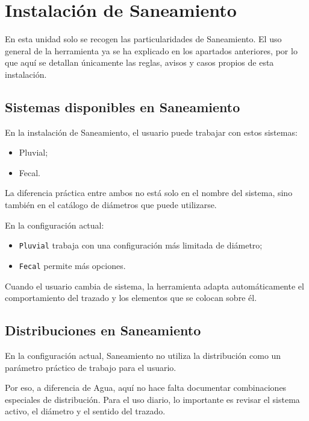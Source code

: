 ﻿\section{Instalación de Saneamiento}

En esta unidad solo se recogen las particularidades de Saneamiento. El uso general de la herramienta ya se ha explicado en los apartados anteriores, por lo que aquí se detallan únicamente las reglas, avisos y casos propios de esta instalación.

\subsection{Sistemas disponibles en Saneamiento}

En la instalación de Saneamiento, el usuario puede trabajar con estos sistemas:

\begin{itemize}
\item Pluvial;
\item Fecal.
\end{itemize}

La diferencia práctica entre ambos no está solo en el nombre del sistema, sino también en el catálogo de diámetros que puede utilizarse.

En la configuración actual:

\begin{itemize}
\item \texttt{Pluvial} trabaja con una configuración más limitada de diámetro;
\item \texttt{Fecal} permite más opciones.
\end{itemize}

Cuando el usuario cambia de sistema, la herramienta adapta automáticamente el comportamiento del trazado y los elementos que se colocan sobre él.


\subsection{Distribuciones en Saneamiento}

En la configuración actual, Saneamiento no utiliza la distribución como un parámetro práctico de trabajo para el usuario.

Por eso, a diferencia de Agua, aquí no hace falta documentar combinaciones especiales de distribución. Para el uso diario, lo importante es revisar el sistema activo, el diámetro y el sentido del trazado.

